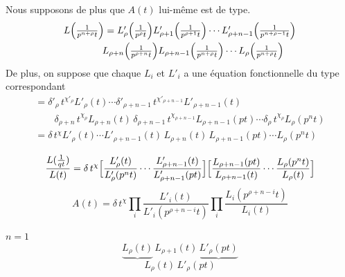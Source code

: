 \documentclass[11pt,a4paper]{article}
\begin{document}
Nous supposons de plus que $A(t)$ lui-même est de  type.
\[
  \begin{array}{l}
  L\Bigl(\frac{1}{p^{n+\rho}t}\Bigr)
  = L'_{\rho}\Bigl(\frac{1}{p^{\rho}t}\Bigr) L'_{\rho+1}\Bigl(\frac{1}{p^{\rho+1}t}\Bigr)
    \cdots L'_{\rho+n-1}\Bigl(\frac{1}{p^{n+\rho-1}t}\Bigr) \\[6pt]
  \qquad\qquad L_{\rho+n}\Bigl(\frac{1}{p^{\rho+n}t}\Bigr)
    L_{\rho+n-1}\Bigl(\frac{1}{p^{n+\rho}t}\Bigr) \cdots L_{\rho}\Bigl(\frac{1}{p^{n+\rho}t}\Bigr)
  \end{array}
\]
De plus, on suppose que chaque $L_i$ et $L'_i$ a une équation
fonctionnelle du type correspondant
\[
  \begin{array}{l}
  = \delta'_{\rho}\, t^{\chi'_{\rho}} L'_{\rho}(t) \cdots
    \delta'_{\rho+n-1}\, t^{\chi'_{\rho+n-1}} L'_{\rho+n-1}(t) \\[4pt]
  \qquad \delta_{\rho+n}\, t^{\chi_{\rho}} L_{\rho+n}(t)\,
    \delta_{\rho+n-1}\, t^{\chi_{\rho+n-1}} L_{\rho+n-1}(pt) \cdots
    \delta_{\rho}\, t^{\chi_{\rho}} L_{\rho}(p^{n}t) \\[4pt]
  = \delta\, t^{\chi} L'_{\rho}(t) \cdots L'_{\rho+n-1}(t)\,
    L_{\rho+n}(t)\, L_{\rho+n-1}(pt) \cdots L_{\rho}(p^{n}t)
  \end{array}
\]

\[
  \frac{L(\frac{1}{qt})}{L(t)}
  = \delta\, t^{\chi}
  \Bigl[\frac{L'_{\rho}(t)}{L'_{\rho}(p^{n}t)} \cdots
    \frac{L'_{\rho+n-1}(t)}{L'_{\rho+n-1}(pt)}\Bigr]
  \Bigl[\frac{L_{\rho+n-1}(pt)}{L_{\rho+n-1}(t)} \cdots
    \frac{L_{\rho}(p^{n}t)}{L_{\rho}(t)}\Bigr]
\]
\[
  A(t) = \delta\, t^{\chi}
  \prod_i \frac{L'_i(t)}{L'_i(p^{\rho+n-i}t)}
  \prod_i \frac{L_i(p^{\rho+n-i}t)}{L_i(t)}
\]

$n = 1$
\[
  \underbrace{L_{\rho}(t)}\, L_{\rho+1}(t)\, \underbrace{L'_{\rho}(pt)}
\]
\[
  L_{\rho}(t)\, L'_{\rho}(pt)
\]
\end{document}
